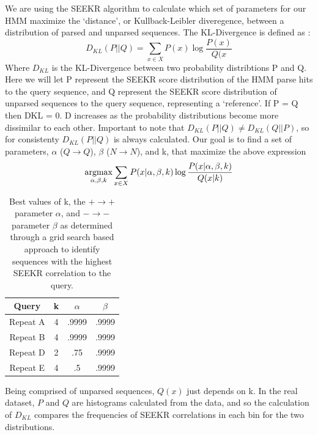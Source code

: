 We are using the SEEKR algorithm to calculate which set of parameters for our HMM maximize the ‘distance’, or Kullback-Leibler diveregence, between a distribution of parsed and unparsed sequences.
The KL-Divergence is defined as \cite{Brookes1951FoundationsProbability}:
\begin{equation}
    D_{KL}(P||Q) = \sum_{x\in X}P(x)\log{\frac{P(x)}{Q(x}}
\end{equation}
Where $D_{KL}$ is the KL-Divergence between two probability distribtions P and Q. Here we will let P represent the SEEKR score distribution of the HMM parse hits to the query sequence, and Q represent the SEEKR score distribution of unparsed sequences to the query sequence, representing a ‘reference’. If P = Q then DKL = 0. D increases as the probability distributions become more dissimilar to each other. Important to note that $D_{KL}(P||Q) \neq D_{KL}(Q||P)$, so for consistenty $D_{KL}(P||Q)$ is always calculated.
Our goal is to find a set of parameters, $\alpha$ ($Q\rightarrow Q$), $\beta$ ($N\rightarrow N$), and k, that maximize the above expression
\begin{equation}
    \operatorname*{argmax}_{\alpha,\beta,k}\sum_{x\in X}P(x|\alpha,\beta,k)\log{\frac{P(x|\alpha,\beta,k)}{Q(x|k)}}
\end{equation}


\begin{table}[h]
\centering
\begin{center}
 \begin{tabular}{|c | c| c | c |} 
 \hline
 Query & k & $\alpha$ & $\beta$ \\
 \hline\hline
 Repeat A & 4 & .9999 & .9999 \\ 
 \hline
 Repeat B & 4 & .9999 & .9999\\
 \hline
 Repeat D & 2 & .75 & .9999\\
 \hline
 Repeat E & 4 & .5 & .9999\\
 \hline
\end{tabular}
\end{center}
\caption{Best values of k, the $+\rightarrow +$ parameter $\alpha$, and $-\rightarrow -$ parameter $\beta$ as determined through a grid search based approach to identify sequences with the highest SEEKR correlation to the query.}
\label{tbl:transparams}
\end{table}

Being comprised of unparsed sequences, $Q(x)$ just depends on k.
In the real dataset, $P$ and $Q$ are histograms calculated from the data, and so the calculation of $D_{KL}$ compares the frequencies of SEEKR correlations in each bin for the two distributions. 

